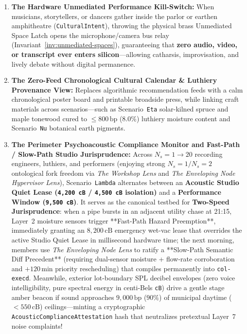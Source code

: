 \begin{enumerate}
    \item \textbf{The Hardware Unmediated Performance Kill-Switch:} When musicians, storytellers, or dancers gather inside the parlor or earthen amphitheatre (\texttt{CulturalIntent}), throwing the physical brass Unmediated Space Latch opens the microphone/camera bus relay (Invariant~\ref{inv:unmediated-spaces}), guaranteeing that \textbf{zero audio, video, or transcript ever enters silicon}---allowing catharsis, improvisation, and lively debate without digital permanence.
    \item \textbf{The Zero-Feed Chronological Cultural Calendar \& Luthiery Provenance View:} Replaces algorithmic recommendation feeds with a calm chronological poster board and printable broadside press, while linking craft materials across scenarios---such as Scenario~\texttt{Eta} solar-kilned spruce and maple tonewood cured to $\le 800\,\mathrm{bp}$ ($8.0\%$) luthiery moisture content and Scenario~\texttt{Nu} botanical earth pigments.
    \item \textbf{The Perimeter Psychoacoustic Compliance Monitor and Fast-Path / Slow-Path Studio Jurisprudence:} Across $N_s = 1 \to 20$ recording engineers, luthiers, and performers (enjoying strong $N_s=1 / N_s=2$ ontological fork freedom via \textit{The Workshop Lens} and \textit{The Enveloping Node Hypervisor Lens}), Scenario~\texttt{Lambda} alternates between an \textbf{Acoustic Studio Quiet Lease (\texttt{4,200 cB} / \texttt{4,500 cB} isolation)} and a \textbf{Performance Window (\texttt{9,500 cB})}. It serves as the canonical testbed for \textbf{Two-Speed Jurisprudence}: when a pipe bursts in an adjacent utility chase at 21:15, Layer~2 moisture sensors trigger **Fast-Path Hazard Preemption**, immediately granting an $8{,}200\,\mathrm{cB}$ emergency wet-vac lease that overrides the active Studio Quiet Lease in millisecond hardware time; the next morning, members use \textit{The Enveloping Node Lens} to ratify a **Slow-Path Semantic Diff Precedent** (requiring dual-sensor moisture + flow-rate corroboration and $+120\,\mathrm{min}$ priority rescheduling) that compiles permanently into \texttt{col-execd}. Meanwhile, exterior lot-boundary SPL decibel envelopes (zero voice intelligibility, pure spectral energy in centi-Bels \texttt{cB}) drive a gentle stage amber beacon if sound approaches $9{,}000\,\mathrm{bp}$ ($90\%$) of municipal daytime ($< 550\,\mathrm{cB}$) ceilings---minting a cryptographic \texttt{AcousticComplianceAttestation} hash that neutralizes pretextual Layer~7 noise complaints!
\end{enumerate}


